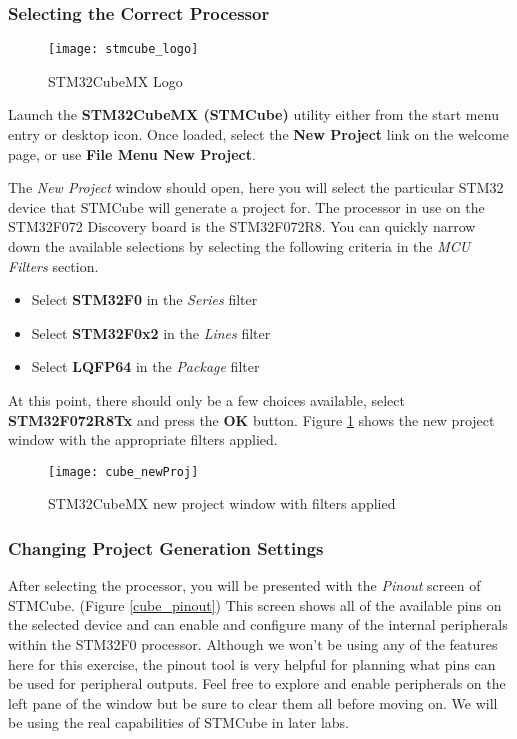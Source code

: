 \documentclass[11pt,fleqn]{book} %
\begin{document}
\subsubsection*{Selecting the Correct Processor}
\begin{wrapfigure}{L}{0.2\textwidth}
	\centering\texttt{[image: stmcube\_logo]}
	\caption{STM32CubeMX Logo}
\end{wrapfigure}

Launch the \textbf{STM32CubeMX (STMCube)} utility either from the start menu entry or desktop icon. Once loaded, select the \textbf{New Project} link on the welcome page, or use \textbf{File Menu \textrightarrow New Project}.

The \textit{New Project} window should open, here you will select the particular STM32 device that STMCube will generate a project for. The processor in use on the STM32F072 Discovery board is the STM32F072R8. You can quickly narrow down the available selections by selecting the following criteria in the \textit{MCU Filters} section.
\begin{itemize}
	\item Select \textbf{STM32F0} in the \textit{Series} filter
	\item Select \textbf{STM32F0x2} in the \textit{Lines} filter
	\item Select \textbf{LQFP64} in the \textit{Package} filter
\end{itemize}
At this point, there should only be a few choices available, select \textbf{STM32F072R8Tx} and press the \textbf{OK} button. Figure \ref{cube_newProj} shows the new project window with the appropriate filters applied.

\begin{figure}[h]
	\centering\texttt{[image: cube\_newProj]}
	\caption{STM32CubeMX new project window with filters applied}
	\label{cube_newProj}
\end{figure}


\subsubsection*{Changing Project Generation Settings}

After selecting the processor, you will be presented with the \textit{Pinout} screen of STMCube. (Figure \ref{cube_pinout}) This screen shows all of the available pins on the selected device and can enable and configure many of the internal peripherals within the STM32F0 processor. Although we won't be using any of the features here for this exercise, the pinout tool is very helpful for planning what pins can be used for peripheral outputs. Feel free to explore and enable peripherals on the left pane of the window but be sure to clear them all before moving on. We will be using the real capabilities of STMCube in later labs.
\end{document}
